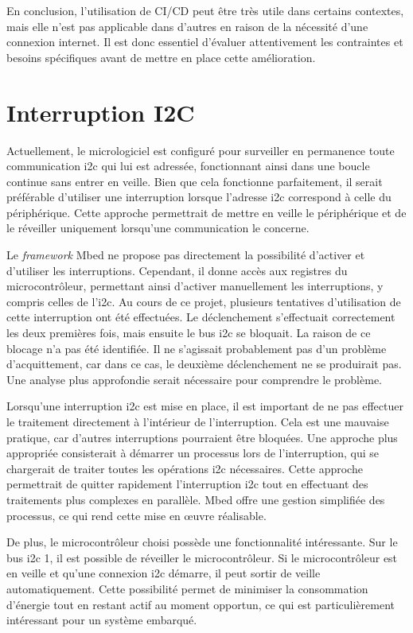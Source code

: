 En conclusion, l'utilisation de CI/CD peut être très utile dans certains contextes, mais elle n'est pas applicable dans d'autres en raison de la nécessité d'une connexion internet.
Il est donc essentiel d'évaluer attentivement les contraintes et besoins spécifiques avant de mettre en place cette amélioration.

\section{Interruption I2C}

Actuellement, le micrologiciel est configuré pour surveiller en permanence toute communication \gls{i2c} qui lui est adressée, fonctionnant ainsi dans une boucle continue sans entrer en veille.
Bien que cela fonctionne parfaitement, il serait préférable d'utiliser une interruption lorsque l'adresse \gls{i2c} correspond à celle du périphérique.
Cette approche permettrait de mettre en veille le périphérique et de le réveiller uniquement lorsqu'une communication le concerne.

Le \textit{\gls{framework}} Mbed ne propose pas directement la possibilité d'activer et d'utiliser les interruptions.
Cependant, il donne accès aux registres du microcontrôleur, permettant ainsi d'activer manuellement les interruptions, y compris celles de l'\gls{i2c}.
Au cours de ce projet, plusieurs tentatives d'utilisation de cette interruption ont été effectuées.
Le déclenchement s'effectuait correctement les deux premières fois, mais ensuite le bus \gls{i2c} se bloquait.
La raison de ce blocage n'a pas été identifiée.
Il ne s'agissait probablement pas d'un problème d'acquittement, car dans ce cas, le deuxième déclenchement ne se produirait pas.
Une analyse plus approfondie serait nécessaire pour comprendre le problème.

Lorsqu'une interruption \gls{i2c} est mise en place, il est important de ne pas effectuer le traitement directement à l'intérieur de l'interruption.
Cela est une mauvaise pratique, car d'autres interruptions pourraient être bloquées.
Une approche plus appropriée consisterait à démarrer un processus lors de l'interruption, qui se chargerait de traiter toutes les opérations \gls{i2c} nécessaires.
Cette approche permettrait de quitter rapidement l'interruption \gls{i2c} tout en effectuant des traitements plus complexes en parallèle.
Mbed offre une gestion simplifiée des processus, ce qui rend cette mise en œuvre réalisable.

De plus, le microcontrôleur choisi possède une fonctionnalité intéressante.
Sur le bus \gls{i2c} 1, il est possible de réveiller le microcontrôleur. Si le microcontrôleur est en veille et qu'une connexion \gls{i2c} démarre, il peut sortir de veille automatiquement.
Cette possibilité permet de minimiser la consommation d'énergie tout en restant actif au moment opportun, ce qui est particulièrement intéressant pour un système embarqué.

